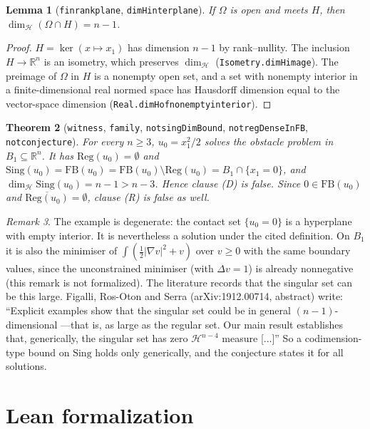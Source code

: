 \documentclass[11pt]{article}
\newtheorem{theorem}{Theorem}
\newtheorem{lemma}[theorem]{Lemma}
\theoremstyle{definition}
\theoremstyle{remark}
\newtheorem{remark}[theorem]{Remark}
\renewcommand{\_}{\oldus\allowbreak}
\begin{document}
\begin{lemma}[\texttt{finrank\_plane}, \texttt{dimH\_inter\_plane}]
If $\Omega$ is open and meets $H$, then $\dim_{\mathcal H}(\Omega\cap H)=n-1$.
\end{lemma}
\begin{proof}
$H=\ker(x\mapsto x_1)$ has dimension $n-1$ by rank--nullity. The inclusion $H\to\mathbb R^n$ is an
isometry, which preserves $\dim_{\mathcal H}$ (\texttt{Isometry.dimH\_image}). The preimage of
$\Omega$ in $H$ is a nonempty open set, and a set with nonempty interior in a finite-dimensional real normed space has
Hausdorff dimension equal to the vector-space dimension (\texttt{Real.dimH\_of\_nonempty\_interior}).
\end{proof}

\begin{theorem}[\texttt{witness}, \texttt{family}, \texttt{not\_singDimBound}, \texttt{not\_regDenseInFB}, \texttt{not\_conjecture}]
For every $n\ge 3$, $u_0=x_1^2/2$ solves the obstacle problem in $B_1\subseteq\mathbb R^n$. It has
$\mathrm{Reg}(u_0)=\emptyset$ and $\mathrm{Sing}(u_0)=\mathrm{FB}(u_0)=\mathrm{FB}(u_0)\setminus\mathrm{Reg}(u_0)=B_1\cap\{x_1=0\}$, and
$\dim_{\mathcal H}\mathrm{Sing}(u_0)=n-1>n-3$. Hence clause (D) is false. Since
$0\in\mathrm{FB}(u_0)$ and $\overline{\mathrm{Reg}(u_0)}=\emptyset$, clause (R) is false as well.
\end{theorem}

\begin{remark}
The example is degenerate: the contact set $\{u_0=0\}$ is a hyperplane with empty interior. It is
nevertheless a solution under the cited definition. On $B_1$ it is also the minimiser of
$\int(\frac12|\nabla v|^2+v)$ over $v\ge0$ with the same boundary values, since the unconstrained
minimiser (with $\Delta v=1$) is already nonnegative (this remark is not formalized). The literature
records that the singular set can be this large. Figalli, Ros-Oton and Serra (arXiv:1912.00714,
abstract) write: ``Explicit examples show that the singular set could be in general
$(n-1)$-dimensional ---that is, as large as the regular set. Our main result establishes that,
generically, the singular set has zero $\mathcal H^{n-4}$ measure [...]'' So a codimension-type bound on
$\mathrm{Sing}$ holds only generically, and the conjecture states it for all solutions.
\end{remark}

\section{Lean formalization}
\end{document}

